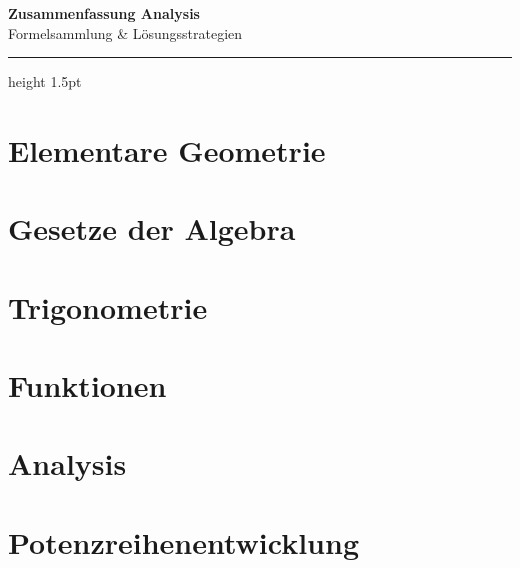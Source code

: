 \documentclass[a4paper, 11pt]{article}
\begin{document}
	
	\begin{center}
		{\LARGE \textbf{\color{mainblue}Zusammenfassung Analysis}}\\[6pt]
		{\large\color{darkgrey}Formelsammlung \& Lösungsstrategien}
	\end{center}
	\vspace{0.5em}
	\hrule height 1.5pt
	\vspace{1em}
	
	\tableofcontents
	\newpage
	
	\section{Elementare Geometrie}
	
	
	\section{Gesetze der Algebra}
	
	
	\section{Trigonometrie}
	
	
	\section{Funktionen}
	
	
	\section{Analysis}
	
	
	\section{Potenzreihenentwicklung}
	
	
\end{document}
